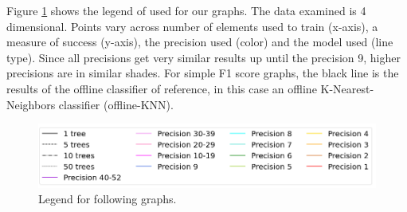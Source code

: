 \documentclass[conference]{IEEEtran}
\begin{document}
Figure \ref{legend} shows the legend of used for our graphs. The data examined is 4 dimensional. Points vary across number of elements used to train (x-axis), a measure of success (y-axis), the precision used (color) and the model used (line type). Since all precisions get very similar results up until the precision 9, higher precisions are in similar shades.
For simple F1 score graphs, the black line is the results of the offline classifier of reference, in this case an offline K-Nearest-Neighbors classifier (offline-KNN).
\begin{figure}[htbp]
\centerline{\includegraphics[width=\linewidth]{legend2.png}}
\caption{Legend for following graphs.}
\label{legend}
\end{figure}
\end{document}
